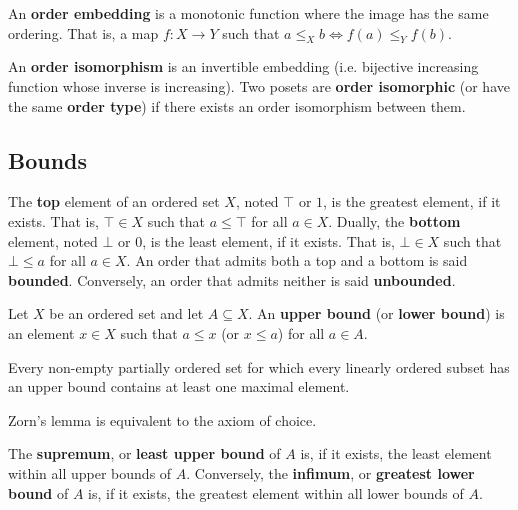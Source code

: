 \documentclass{bareminimum}
\begin{document}
\begin{defn}
	An \textbf{order embedding}  is a monotonic function where the image has the same ordering. That is, a map $f : X \to Y$ such that $a \leq_X b \iff f(a) \leq_Y f(b)$.
\end{defn}

\begin{defn}
	An \textbf{order isomorphism}  is an invertible embedding (i.e. bijective increasing function whose inverse is increasing). Two posets are \textbf{order isomorphic} (or have the same \textbf{order type}) if there exists an order isomorphism between them.
\end{defn}

\subsection{Bounds}

\begin{defn}
	The \textbf{top}  element of an ordered set $X$, noted $\top$ or $1$, is the greatest element, if it exists. That is, $\top \in X$ such that $a \leq \top$ for all $a \in X$. Dually, the \textbf{bottom} element, noted $\bot$ or $0$, is the least element, if it exists. That is, $\bot \in X$ such that $\bot \leq a$ for all $a \in X$. An order that admits both a top and a bottom is said \textbf{bounded}. Conversely, an order that admits neither is said \textbf{unbounded}.
\end{defn}

\begin{defn}
	Let $X$ be an  ordered set and let $A \subseteq X$. An \textbf{upper bound} (or \textbf{lower bound}) is an element $x \in X$ such that $a \leq x$ (or $x \leq a$) for all $a \in A$.
\end{defn}

\begin{prop}
	Every non-empty partially ordered set for which every linearly ordered subset has an upper bound contains at least one maximal element.
\end{prop}

\begin{prop}
	Zorn's lemma is equivalent to the axiom of choice.
\end{prop}

\begin{defn}
	The \textbf{supremum},  or \textbf{least upper bound} of $A$ is, if it exists, the least element within all upper bounds of $A$. Conversely, the \textbf{infimum},  or \textbf{greatest lower bound} of $A$ is, if it exists, the greatest element within all lower bounds of $A$.
\end{defn}
\end{document}
